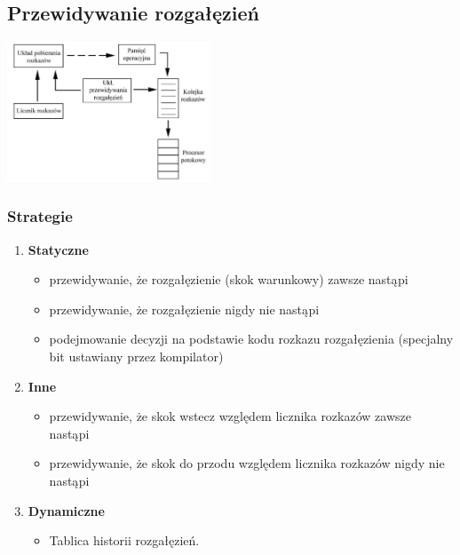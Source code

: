    	\subsection{Przewidywanie rozgałęzień}
   		\begin{center}
   			\includegraphics[width=0.45\textwidth]{./images/potok04}
   		\end{center}
   		\subsubsection{Strategie}
	   	\begin{enumerate}
	   		\item \textbf{Statyczne}
	   		\begin{itemize}
	   			\item przewidywanie, że rozgałęzienie (skok warunkowy) zawsze nastąpi
	   			\item przewidywanie, że rozgałęzienie nigdy nie nastąpi
	   			\item podejmowanie decyzji na podstawie kodu rozkazu rozgałęzienia (specjalny bit ustawiany przez kompilator)
	   		\end{itemize}
	   		\item \textbf{Inne}
	   		\begin{itemize}
	   			\item przewidywanie, że skok wstecz względem licznika rozkazów zawsze nastąpi
	   			\item przewidywanie, że skok do przodu względem licznika rozkazów nigdy nie nastąpi
	   		\end{itemize}
	   		\item \textbf{Dynamiczne}
	   		\begin{itemize}
	   			\item Tablica historii rozgałęzień.
	   		\end{itemize}
	   	\end{enumerate}
\newpage
